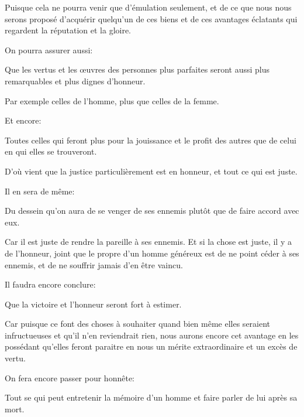 Puisque cela ne pourra venir que d'émulation seulement, et de ce que nous nous serons proposé d'acquérir quelqu'un
de ces biens et de ces avantages éclatants qui regardent la réputation et la gloire. 

\bigbreak

On pourra assurer aussi:

\begin{lieu}
	Que les vertus et les œuvres des personnes plus parfaites seront aussi plus remarquables et plus dignes d'honneur.
\end{lieu}

Par exemple celles de l'homme, plus que celles de la femme. 

\bigbreak

Et encore:

\begin{lieu}
	Toutes celles qui feront plus pour la jouissance et le profit des autres que de celui en qui elles se trouveront.
\end{lieu}

D'où vient que la justice particulièrement est en honneur, et tout ce qui est juste.

\bigbreak

Il en sera de même:

\begin{lieu}
	Du dessein qu'on aura de se venger de ses ennemis plutôt que de faire accord avec eux.
\end{lieu}

Car il est juste de rendre la pareille à ses ennemis. Et si la chose est juste, il y a de l'honneur, joint que le
propre d'un homme généreux est de ne point céder à ses ennemis, et de ne souffrir jamais d'en être vaincu.

\bigbreak

Il faudra encore conclure:

\begin{lieu}
	Que la victoire et l'honneur seront fort à estimer.
\end{lieu}

Car puisque ce font des choses à souhaiter quand bien même elles seraient infructueuses et qu'il n'en reviendrait
rien, nous aurons encore cet avantage en les possédant qu'elles feront paraitre en nous un mérite extraordinaire
et un excès de vertu. 

\bigbreak

On fera encore passer pour honnête:

\begin{lieu}
	Tout se qui peut entretenir la mémoire d'un homme et faire parler de lui après sa mort.
\end{lieu}

